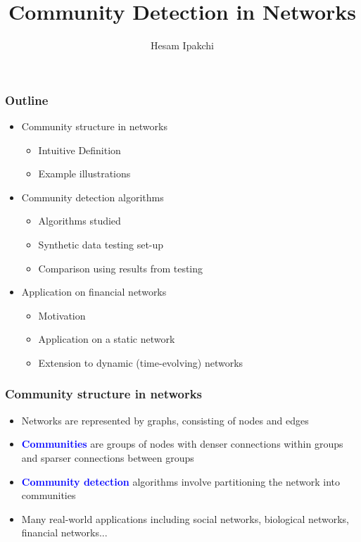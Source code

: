 \documentclass{beamer}
\title[Community Detection in Networks]{Community Detection in Networks} %
\author{Hesam Ipakchi} %
\institute[Imperial College London] %
{
Imperial College London \\ %
\medskip
\textit{hesam.ipakchi10@imperial.ac.uk} %
}
\date{\displaydate{presentationDate}} %
\begin{document}
\begin{frame}
\titlepage %
\end{frame}


\begin{frame}
	\frametitle{Outline}
	\begin{itemize}
		\vfill\item Community structure in networks
		\begin{itemize}
			\item Intuitive Definition
			\item Example illustrations
		\end{itemize}
		\vfill\item Community detection algorithms
		\begin{itemize}
			\item Algorithms studied
			\item Synthetic data testing set-up
			\item Comparison using results from testing
		\end{itemize}
		\vfill\item Application on financial networks
		\begin{itemize}
			\item Motivation
			\item Application on a static network
			\item Extension to dynamic (time-evolving) networks
		\end{itemize}
	\end{itemize}
\end{frame}


\begin{frame}
	\frametitle{Community structure in networks}
	\begin{itemize}
		\vfill\item Networks are represented by graphs, consisting of nodes and edges
		\vfill\item \textbf{\textcolor{blue}{Communities}} are groups of nodes with denser connections within groups and sparser connections between groups
		\vfill\item \textbf{\textcolor{blue}{Community detection}} algorithms involve partitioning the network into communities
		\vfill\item Many real-world applications including social networks, biological networks, financial networks...
	\end{itemize}
\end{frame}
\end{document}
